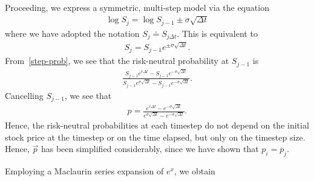 \documentclass[12pt]{amsbook}
\theoremstyle{plain}
\theoremstyle{definition}
\theoremstyle{remark}
\numberwithin{equation}{section}  %
\begin{document}
Proceeding, we express a symmetric, multi-step model via the equation
\begin{equation*}
	\begin{split}
		\log S_{j} = \log S_{j - 1} \pm \sigma \sqrt{\Delta t}
	\end{split}
\end{equation*}
where we have adopted the notation $S_{j} \doteq S_{j \Delta t}$.
This is equivalent to 
\begin{equation*}
	\begin{split}
		S_{j} = S_{j -1} e^{\pm \sigma \sqrt{\Delta t}}.
	\end{split}
\end{equation*}
From~\eqref{step-prob}, we see that the risk-neutral probability
at $S_{j-1}$ is
\begin{equation*}
	\begin{split}
		\frac{S_{j-1}e^{r \Delta t} - S_{j-1} e^{-\sigma \sqrt{\Delta
		t}}}{S_{j-1}e^{\sigma \sqrt{\Delta t}} - S_{j-1}e^{-\sigma \sqrt{\Delta t}}}.
	\end{split}
\end{equation*}
Cancelling $S_{j-1}$, we see that 
\begin{equation*}
	\begin{split}
		p  = \frac{e^{r \Delta t} -  e^{-\sigma \sqrt{\Delta t}}}{e^{\sigma
			\sqrt{\Delta t}} - e^{-\sigma \sqrt{\Delta t}}}.
		\end{split}
	\end{equation*}
	Hence, the risk-neutral probabilities at each timestep do not depend
	on the initial stock price at the timestep or on the time elapsed,
	but only on the timestep size. Hence, $\vec{p}$ has been simplified
	considerably, since we have shown that $p_{i} = p_{j}$. 

	Employing a Maclaurin series expansion of $e^{x}$, we obtain
\end{document}
